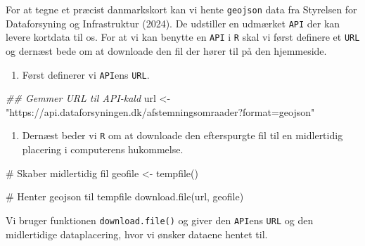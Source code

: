 \documentclass[
  a4paper,
  DIV=11,
  numbers=noendperiod,
  oneside]{scrartcl}
\newenvironment{Shaded}{\begin{snugshade}}{\end{snugshade}}
\newcommand{\CommentTok}[1]{\textcolor[rgb]{0.37,0.37,0.37}{#1}}
\newcommand{\DocumentationTok}[1]{\textcolor[rgb]{0.37,0.37,0.37}{\textit{#1}}}
\newcommand{\FunctionTok}[1]{\textcolor[rgb]{0.28,0.35,0.67}{#1}}
\newcommand{\NormalTok}[1]{\textcolor[rgb]{0.00,0.23,0.31}{#1}}
\newcommand{\OtherTok}[1]{\textcolor[rgb]{0.00,0.23,0.31}{#1}}
\newcommand{\StringTok}[1]{\textcolor[rgb]{0.13,0.47,0.30}{#1}}
\providecommand{\tightlist}{%
  \setlength{\itemsep}{0pt}\setlength{\parskip}{0pt}}\usepackage{longtable,booktabs,array}
\begin{document}
For at tegne et præcist danmarkskort kan vi hente \texttt{geojson} data
fra Styrelsen for Dataforsyning og Infrastruktur (2024). De udstiller en
udmærket \texttt{API} der kan levere kortdata til os. For at vi kan
benytte en \texttt{API} i \texttt{R} skal vi først definere et
\texttt{URL} og dernæst bede om at downloade den fil der hører til på
den hjemmeside.

\begin{enumerate}
\def\labelenumi{\arabic{enumi}.}
\tightlist
\item
  Først definerer vi \texttt{API}ens \texttt{URL}.
\end{enumerate}

\begin{Shaded}
\begin{Highlighting}[]
\DocumentationTok{\#\# Gemmer URL til API{-}kald}
\NormalTok{url }\OtherTok{\textless{}{-}} \StringTok{"https://api.dataforsyningen.dk/afstemningsomraader?format=geojson"}
\end{Highlighting}
\end{Shaded}


\begin{enumerate}
\def\labelenumi{\arabic{enumi}.}
\setcounter{enumi}{1}
\tightlist
\item
  Dernæst beder vi \texttt{R} om at downloade den efterspurgte fil til
  en midlertidig placering i computerens hukommelse.
\end{enumerate}

\begin{Shaded}
\begin{Highlighting}[]
\CommentTok{\# Skaber midlertidig fil}
\NormalTok{geofile }\OtherTok{\textless{}{-}} \FunctionTok{tempfile}\NormalTok{()}

\CommentTok{\# Henter geojson til tempfile}
\FunctionTok{download.file}\NormalTok{(url, geofile)}
\end{Highlighting}
\end{Shaded}

Vi bruger funktionen \texttt{download.file()} og giver den
\texttt{API}ens \texttt{URL} og den midlertidige dataplacering, hvor vi
ønsker dataene hentet til.
\end{document}
